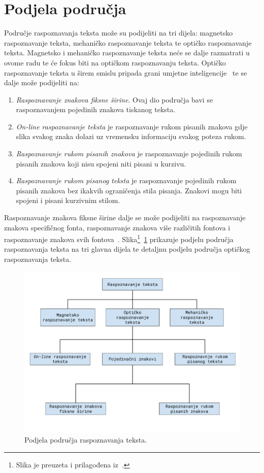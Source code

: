 \section{Podjela područja}
\label{sec:podjela-podrucja}
Područje raspoznavanja teksta može su podijeliti na tri dijela: magnetsko raspoznavanje teksta, mehaničko raspoznavanje
teksta te optičko raspoznavanje teksta. Magnetsko i mehaničko raspoznavanje teksta neće se dalje razmatrati u ovome
radu te će fokus biti na optičkom raspoznavanju teksta. Optičko raspoznavanje teksta u širem smislu pripada grani
umjetne inteligencije\ \citep{mori1999} te se dalje može podijeliti na:
\begin{enumerate}
    \item \emph{Raspoznavanje znakova fiksne širine}. Ovaj dio područja bavi se raspoznavanjem pojedinih znakova
    tiskanog teksta.
    \item \emph{On-line raspoznavanje teksta} je raspoznavanje rukom pisanih znakova gdje slika svakog znaka dolazi uz
    vremensku informaciju svakog poteza rukom.
    \item \emph{Raspoznavanje rukom pisanih znakova} je raspoznavanje pojedinih rukom pisanih znakova koji nisu spojeni
    niti pisani u kurzivu.
    \item \emph{Raspoznavanje rukom pisanog teksta} je raspoznavanje pojedinih rukom pisanih znakova bez ikakvih
    ograničenja stila pisanja. Znakovi mogu biti spojeni i pisani kurzivnim stilom.
\end{enumerate}
Raspoznavanje znakova fiksne širine dalje se može podijeliti na raspoznavanje znakova specifičnog fonta, raspoznavanje
znakova više različitih fontova i raspoznavanje znakova svih fontova\ \citep{govindan1989}.
Slika\footnote{Slika je preuzeta i prilagođena iz\ \citep{mantas1986}.}\ \ref{fig:podjela-podrucja-raspoznavanja-teksta}
prikazuje podjelu područja raspoznavanja teksta na tri glavna dijela te detaljnu podjelu područja optičkog raspoznavanja
teksta.
\begin{figure}[htb]
    \centering
    \includegraphics[width=12cm]{images/chapter2/character-recognition-categories.pdf}
    \caption{Podjela područja raspoznavanja teksta.}
    \label{fig:podjela-podrucja-raspoznavanja-teksta}
\end{figure}
